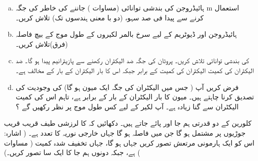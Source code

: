 \begin{enumerate}[a.]
\item
 ہائیڈروجن کی بندشی توانائی (مساوات ) جاننے کی خاطر  کی جگہ m استعمال کرنے سے پیدا فی صد سہو، (دو با معنی ہندسوں تک) تلاش کریں۔ 
\item
 ہائیڈروجن اور ڈیوٹریم کے لیے سرخ بالمر لکیروں  کے طول موج کے بیچ فاصلہ (فرق)تلاش کریں۔ 
\item
  کی بندشی توانائی تلاش کریں۔ پروٹان کی جگہ ضد الیکٹران رکھنے سے پازیٹرانیم پیدا ہو گا۔ ضد الیکٹران کی کمیت الیکٹران کی کمیت کے برابر جبکہ اس کا بار الیکٹران کے بار کے مخالف ہے۔ 
\item
 فرض کریں آپ  ( جس میں الیکٹران کی جگہ ایک میون ہو گا) کی وجودیت کی تصدیق کرنا چاہتے ہیں۔ میون کا بار الیکٹران کے بار کے برابر ہے، تاہم اس کی کمیت الیکٹران سے گنا زیادہ ہے۔ آپ  لکیر  کے لیے کس طول موج پر نظر رکھیں گے ؟
\end{enumerate}
کلورین کے دو قدرتی ہم جا  اور  پائے جاتے ہیں۔ دکھائیں کہ  کا لرزشی طیف قریب قریب جوڑیوں پر مشتمل ہو گا جن میں فاصلہ  ہو گا جہاں  خارجی نوریہ کا تعدد ہے۔ ( اشارہ: اس کو ایک ہارمونی مرتعش تصور کریں
 جہاں  ہو گا، جہاں  تخفیف شدہ کمیت ( مساوات  ) ہے، جبکہ دونوں ہم جا کا  ایک سا تصور کریں۔) 


